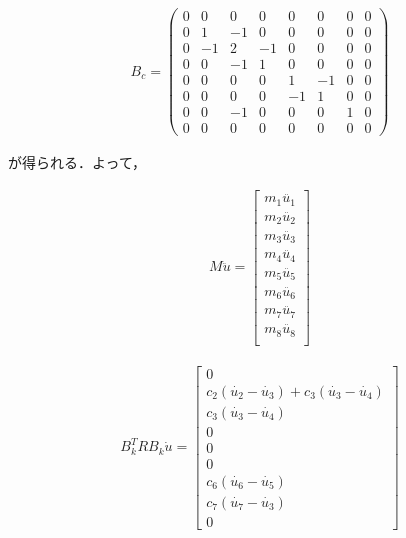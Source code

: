 \begin{eqnarray}
    B_c = 
    \left(\begin{matrix}
        0   & 0   & 0   & 0   & 0  & 0  & 0  & 0  \\
        0   & 1   & -1  & 0   & 0  & 0  & 0  & 0  \\
        0   & -1  & 2   & -1  & 0  & 0  & 0  & 0  \\
        0   & 0   & -1  & 1   & 0  & 0  & 0  & 0  \\
        0   & 0   & 0   & 0   & 1  & -1 & 0  & 0  \\
        0   & 0   & 0   & 0   & -1 & 1  & 0  & 0  \\
        0   & 0   & -1  & 0   & 0  & 0  & 1  & 0  \\
        0   & 0   & 0   & 0   & 0  & 0  & 0  & 0  
    \end{matrix}\right)
\end{eqnarray}

が得られる．よって，

\begin{eqnarray}
    M\ddot{u} =
    \left[\begin{matrix}
        m_1 \ddot{u_1} \\
        m_2 \ddot{u_2} \\
        m_3 \ddot{u_3} \\
        m_4 \ddot{u_4} \\
        m_5 \ddot{u_5} \\
        m_6 \ddot{u_6} \\
        m_7 \ddot{u_7} \\
        m_8 \ddot{u_8} \\
    \end{matrix}\right]
\end{eqnarray}

\begin{eqnarray}
    B_k^T R B_k \dot{u} =
    \left[\begin{matrix}
        0 \\
        c_2 (\dot{u_2} - \dot{u_3}) + c_3 (\dot{u_3} - \dot{u_4}) \\
        c_3 (\dot{u_3} - \dot{u_4}) \\
        0 \\
        0 \\
        0 \\
        c_6 (\dot{u_6} - \dot{u_5}) \\
        c_7 (\dot{u_7} - \dot{u_3}) \\
        0
    \end{matrix}\right]
\end{eqnarray}


